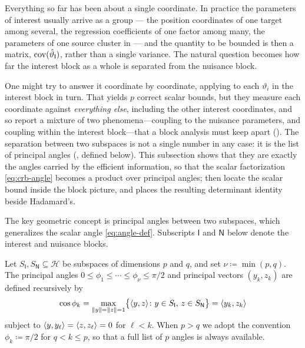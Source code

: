 \documentclass{IEEEtran}
\begin{document}
Everything so far has been about a single coordinate. In practice the parameters of interest usually arrive as a group --- the position coordinates of one target among several, the regression coefficients of one factor among many, the parameters of one source cluster in  --- and the quantity to be bounded is then a matrix, $\operatorname{cov}(\hat{\vartheta}_{\mathsf{I}})$, rather than a single variance. The natural question becomes how far the interest block as a whole is separated from the nuisance block.

One might try to answer it coordinate by coordinate, applying  to each $\vartheta_{i}$ in the interest block in turn. That yields $p$ correct scalar bounds, but they measure each coordinate against \emph{everything else}, including the other interest coordinates, and so report a mixture of two phenomena---coupling to the nuisance parameters, and coupling within the interest block---that a block analysis must keep apart (). The separation between two subspaces is not a single number in any case: it is the list of principal angles (, defined below). This subsection shows that they are exactly the angles carried by the efficient information, so that the scalar factorization \eqref{eq:crb-angle} becomes a product over principal angles;  then locate the scalar bound inside the block picture, and  places the resulting determinant identity beside Hadamard's.

The key geometric concept is principal angles between two subspaces, which generalizes the scalar angle \eqref{eq:angle-def}. Subscripts $\mathsf{I}$ and $\mathsf{N}$ below denote the interest and nuisance blocks.

\begin{definition}\label{def:principal-angles}
  Let $S_{\mathsf{I}}, S_{\mathsf{N}} \subseteq \mathcal{H}$ be subspaces of dimensions $p$ and $q$, and set $\nu \coloneq \min(p,q)$. The principal angles $0 \le \phi_{1} \le \cdots \le \phi_{\nu} \le \pi/2$ and principal vectors $(y_{k}, z_{k})$ are defined recursively by
  \begin{equation}
    \cos\phi_{k}
    = \max_{\lVert y\rVert=\lVert z\rVert=1} \bigl\{\langle y, z\rangle \colon y \in S_{\mathsf{I}},\, z \in S_{\mathsf{N}}  \bigr\}
    = \langle y_{k}, z_{k}\rangle
    \label{eq:principal-angle-def}
  \end{equation}
  subject to $\langle y, y_{\ell}\rangle = \langle z, z_{\ell}\rangle = 0$ for $\ell < k$. When $p > q$ we adopt the convention $\phi_{k} \coloneq \pi/2$ for $q < k \le p$, so that a full list of $p$ angles is always available.
\end{definition}
\end{document}

